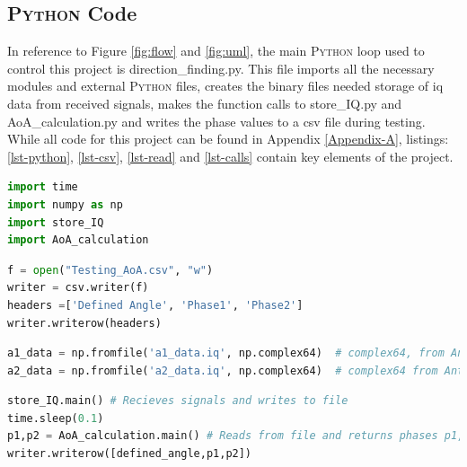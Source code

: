 \documentclass[class=report,11pt,crop=false]{standalone}
\begin{document}
\subsection{\textsc{Python} Code}
In reference to Figure \ref{fig:flow} and \ref{fig:uml}, the main \textsc{Python} loop used to control this project is direction\_finding.py. This file imports all the necessary modules and external \textsc{Python} files, creates the binary files needed storage of \gls{iq} data from received signals, makes the function calls to store\_IQ.py and AoA\_calculation.py and writes the phase values to a csv file during testing. While all code for this project can be found in Appendix \ref{Appendix-A}, listings: \ref{lst-python}, \ref{lst-csv}, \ref{lst-read} and \ref{lst-calls} contain key elements of the project. 

\noindent\hspace{0.08\linewidth}\begin{minipage}[t]{.35\linewidth}\centering
\begin{lstlisting}[language={Python}, caption={Import statements from direction\_finding.py for control of the project}, label={lst-python}]
import time 
import numpy as np
import store_IQ
import AoA_calculation
\end{lstlisting}
\end{minipage}%
\hspace{0.5cm}
\begin{minipage}[t]{.51\linewidth}\centering
\begin{lstlisting}[language=Python, caption= CSV file writer to store each phase extracted, label={lst-csv}]
f = open("Testing_AoA.csv", "w")
writer = csv.writer(f)
headers =['Defined Angle', 'Phase1', 'Phase2']
writer.writerow(headers)
\end{lstlisting}
\end{minipage}

\begin{lstlisting}[language={Python}, caption={Reading of complex \gls{iq} files implemented in Python}, label={lst-read}]
a1_data = np.fromfile('a1_data.iq', np.complex64)  # complex64, from Antenna 1
a2_data = np.fromfile('a2_data.iq', np.complex64)  # complex64 from Antenna 2
\end{lstlisting}

\begin{lstlisting}[language={Python}, caption={Function calls to receive signals, read data from files, and returned phases written to file.}, label={lst-calls}]
store_IQ.main() # Recieves signals and writes to file
time.sleep(0.1)
p1,p2 = AoA_calculation.main() # Reads from file and returns phases p1,p2
writer.writerow([defined_angle,p1,p2])
\end{lstlisting}
\end{document}
